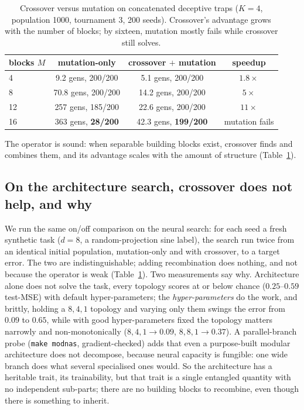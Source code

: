 \documentclass[11pt]{article}
\begin{document}
\begin{table}[t]
\centering
\caption{Crossover versus mutation on concatenated deceptive traps ($K=4$, population
1000, tournament 3, 200 seeds). Crossover's advantage grows with the number of blocks;
by sixteen, mutation mostly fails while crossover still solves.}
\label{tab:bb}
\begin{tabular}{lccc}
\toprule
blocks $M$ & mutation-only & crossover $+$ mutation & speedup \\
\midrule
4  & 9.2 gens, 200/200  & 5.1 gens, 200/200  & $1.8\times$ \\
8  & 70.8 gens, 200/200 & 14.2 gens, 200/200 & $5\times$ \\
12 & 257 gens, 185/200  & 22.6 gens, 200/200 & $11\times$ \\
16 & 363 gens, \textbf{28/200} & 42.3 gens, \textbf{199/200} & mutation fails \\
\bottomrule
\end{tabular}
\end{table}

The operator is sound: when separable building blocks exist, crossover finds and
combines them, and its advantage scales with the amount of structure (Table~\ref{tab:bb}).

\subsection{On the architecture search, crossover does not help, and why}

We run the same on/off comparison on the neural search: for each seed a fresh synthetic
task ($d=8$, a random-projection sine label), the search run twice from an identical
initial population, mutation-only and with crossover, to a target error. The two are
indistinguishable; adding recombination does nothing, and not because the operator is
weak (Table~\ref{tab:bb}). Two measurements say why. Architecture alone does not solve
the task, every topology scores at or below chance ($0.25$--$0.59$ test-MSE) with
default hyper-parameters; the \emph{hyper-parameters} do the work, and brittly, holding
a $8,4,1$ topology and varying only them swings the error from $0.09$ to $0.65$, while
with good hyper-parameters fixed the topology matters narrowly and non-monotonically
($8,4,1 \to 0.09$, $8,8,1 \to 0.37$). A parallel-branch probe (\texttt{make modnas},
gradient-checked) adds that even a purpose-built modular architecture does not
decompose, because neural capacity is fungible: one wide branch does what several
specialised ones would. So the architecture has a heritable trait, its trainability,
but that trait is a single entangled quantity with no independent sub-parts; there are
no building blocks to recombine, even though there is something to inherit.
\end{document}
